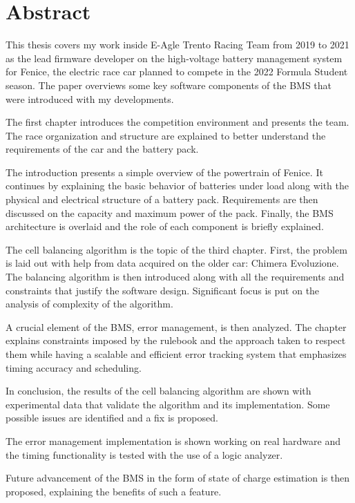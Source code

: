 \chapter*{Abstract}
This thesis covers my work inside E-Agle Trento Racing Team from 2019 to 2021 as the lead firmware developer on the high-voltage battery management system for Fenice, the electric race car planned to compete in the 2022 Formula Student season. The paper overviews some key software components of the BMS that were introduced with my developments.

The first chapter introduces the competition environment and presents the team. The race organization and structure are explained to better understand the requirements of the car and the battery pack.

The introduction presents a simple overview of the powertrain of Fenice. It continues by explaining the basic behavior of batteries under load along with the physical and electrical structure of a battery pack. Requirements are then discussed on the capacity and maximum power of the pack. Finally, the BMS architecture is overlaid and the role of each component is briefly explained.

The cell balancing algorithm is the topic of the third chapter. First, the problem is laid out with help from data acquired on the older car: Chimera Evoluzione. The balancing algorithm is then introduced along with all the requirements and constraints that justify the software design. Significant focus is put on the analysis of complexity of the algorithm.

A crucial element of the BMS, error management, is then analyzed. The chapter explains constraints imposed by the rulebook and the approach taken to respect them while having a scalable and efficient error tracking system that emphasizes timing accuracy and scheduling.

In conclusion, the results of the cell balancing algorithm are shown with experimental data that validate the algorithm and its implementation. Some possible issues are identified and a fix is proposed.

The error management implementation is shown working on real hardware and the timing functionality is tested with the use of a logic analyzer.

Future advancement of the BMS in the form of state of charge estimation is then proposed, explaining the benefits of such a feature.

\newpage


